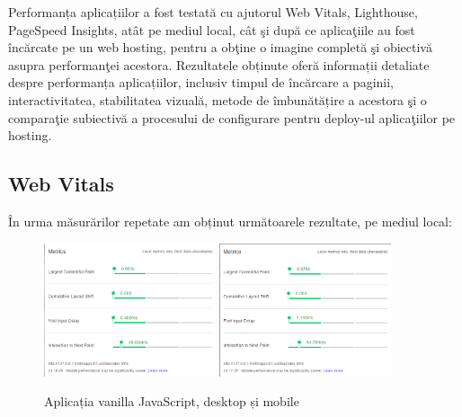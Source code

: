 \documentclass[12pt, a4paper]{report}
\begin{document}
Performanța aplicațiilor a fost testat\u a cu ajutorul Web Vitals, Lighthouse, PageSpeed Insights, at\^at pe mediul local, c\^at \c si dup\u a ce aplica\c tiile au fost \^inc\u arcate pe un web hosting, pentru a ob\c tine o imagine complet\u a \c si obiectiv\u a asupra performan\c tei acestora. 
Rezultatele obținute oferă informații detaliate despre performanța aplicațiilor, inclusiv timpul de încărcare a paginii, interactivitatea, stabilitatea vizuală, metode de îmbunătățire a acestora \c si o compara\c tie subiectiv\u a a procesului de configurare pentru deploy-ul aplica\c tiilor pe hosting. 

\subsection{Web Vitals}

În urma măsurărilor repetate am obținut următoarele rezultate, pe mediul local:

\begin{figure}[htbp]
	\centering
	\includegraphics[width=0.45\textwidth]{01_desktop.png}
	\includegraphics[width=0.45\textwidth]{01_mobile.png}
	\caption{Aplicația vanilla JavaScript, desktop și mobile}
	\label{fig:01-local}
\end{figure}
\end{document}

